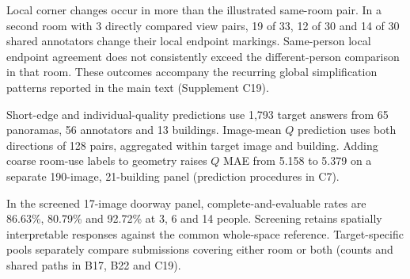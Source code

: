 Local corner changes occur in more than the illustrated same-room pair. In a second room with 3 directly compared view pairs, 19 of 33, 12 of 30 and 14 of 30 shared annotators change their local endpoint markings. Same-person local endpoint agreement does not consistently exceed the different-person comparison in that room. These outcomes accompany the recurring global simplification patterns reported in the main text (Supplement C19).

Short-edge and individual-quality predictions use 1,793 target answers from 65 panoramas, 56 annotators and 13 buildings. Image-mean $Q$ prediction uses both directions of 128 pairs, aggregated within target image and building. Adding coarse room-use labels to geometry raises $Q$ MAE from 5.158 to 5.379 on a separate 190-image, 21-building panel (prediction procedures in C7).

In the screened 17-image doorway panel, complete-and-evaluable rates are 86.63\%, 80.79\% and 92.72\% at 3, 6 and 14 people. Screening retains spatially interpretable responses against the common whole-space reference. Target-specific pools separately compare submissions covering either room or both (counts and shared paths in B17, B22 and C19).

